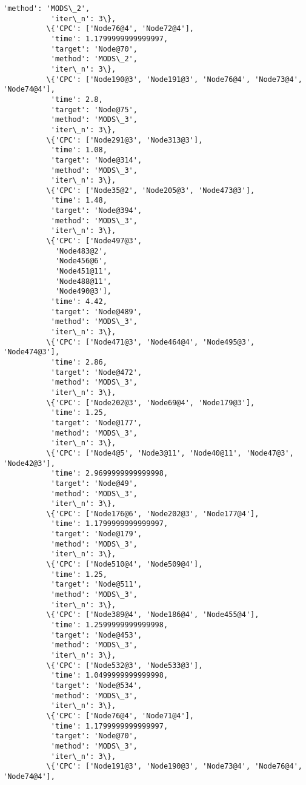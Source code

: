 \documentclass[11pt]{article}
\begin{document}
\begin{Verbatim}[commandchars=\\\{\}]
           'method': 'MODS\_2',
           'iter\_n': 3\},
          \{'CPC': ['Node76@4', 'Node72@4'],
           'time': 1.1799999999999997,
           'target': 'Node@70',
           'method': 'MODS\_2',
           'iter\_n': 3\},
          \{'CPC': ['Node190@3', 'Node191@3', 'Node76@4', 'Node73@4', 'Node74@4'],
           'time': 2.8,
           'target': 'Node@75',
           'method': 'MODS\_3',
           'iter\_n': 3\},
          \{'CPC': ['Node291@3', 'Node313@3'],
           'time': 1.08,
           'target': 'Node@314',
           'method': 'MODS\_3',
           'iter\_n': 3\},
          \{'CPC': ['Node35@2', 'Node205@3', 'Node473@3'],
           'time': 1.48,
           'target': 'Node@394',
           'method': 'MODS\_3',
           'iter\_n': 3\},
          \{'CPC': ['Node497@3',
            'Node483@2',
            'Node456@6',
            'Node451@11',
            'Node488@11',
            'Node490@3'],
           'time': 4.42,
           'target': 'Node@489',
           'method': 'MODS\_3',
           'iter\_n': 3\},
          \{'CPC': ['Node471@3', 'Node464@4', 'Node495@3', 'Node474@3'],
           'time': 2.86,
           'target': 'Node@472',
           'method': 'MODS\_3',
           'iter\_n': 3\},
          \{'CPC': ['Node202@3', 'Node69@4', 'Node179@3'],
           'time': 1.25,
           'target': 'Node@177',
           'method': 'MODS\_3',
           'iter\_n': 3\},
          \{'CPC': ['Node4@5', 'Node3@11', 'Node40@11', 'Node47@3', 'Node42@3'],
           'time': 2.9699999999999998,
           'target': 'Node@49',
           'method': 'MODS\_3',
           'iter\_n': 3\},
          \{'CPC': ['Node176@6', 'Node202@3', 'Node177@4'],
           'time': 1.1799999999999997,
           'target': 'Node@179',
           'method': 'MODS\_3',
           'iter\_n': 3\},
          \{'CPC': ['Node510@4', 'Node509@4'],
           'time': 1.25,
           'target': 'Node@511',
           'method': 'MODS\_3',
           'iter\_n': 3\},
          \{'CPC': ['Node389@4', 'Node186@4', 'Node455@4'],
           'time': 1.2599999999999998,
           'target': 'Node@453',
           'method': 'MODS\_3',
           'iter\_n': 3\},
          \{'CPC': ['Node532@3', 'Node533@3'],
           'time': 1.0499999999999998,
           'target': 'Node@534',
           'method': 'MODS\_3',
           'iter\_n': 3\},
          \{'CPC': ['Node76@4', 'Node71@4'],
           'time': 1.1799999999999997,
           'target': 'Node@70',
           'method': 'MODS\_3',
           'iter\_n': 3\},
          \{'CPC': ['Node191@3', 'Node190@3', 'Node73@4', 'Node76@4', 'Node74@4'],

\end{Verbatim}
\end{document}
